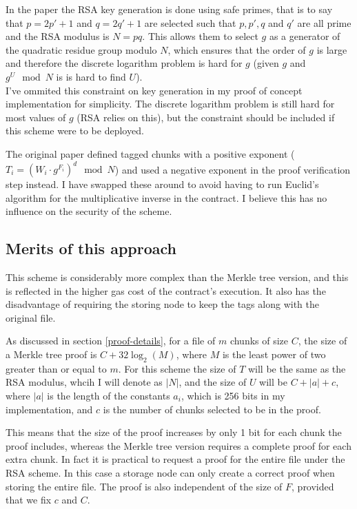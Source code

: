 \documentclass[12pt,a4paper,twoside,openright]{report}
\begin{document}
In the paper the RSA key generation is done using safe primes, that is to say that $p = 2p' + 1$ and $q = 2q' + 1$ are selected
such that $p, p', q$ and $q'$ are all prime and the RSA modulus is $N = pq$.
This allows them to select $g$ as a generator of the quadratic residue group modulo $N$, which ensures
that the order of $g$ is large and therefore the discrete logarithm problem is hard for $g$
(given $g$ and $g^U \mod N$ is is hard to find $U$).\\
I've ommited this constraint on key generation in my proof of concept implementation for simplicity.
The discrete logarithm problem is still hard for most values of $g$ (RSA relies on this), but
the constraint should be included if this scheme were to be deployed.

The original paper defined tagged chunks with a positive exponent ($T_i = \left(W_i \cdot g^{F_i}\right)^d \mod N$)
and used a negative exponent in the proof verification step instead.
I have swapped these around to avoid having to run Euclid's algorithm for the multiplicative inverse in the contract.
I believe this has no influence on the security of the scheme.


\subsection{Merits of this approach}

This scheme is considerably more complex than the Merkle tree version, and this is reflected in the higher gas cost of the contract's execution.
It also has the disadvantage of requiring the storing node to keep the tags along with the original file.

As discussed in section \ref{proof-details}, for a file of $m$ chunks of size $C$, the size of a Merkle tree proof is $C + 32 \log_2(M)$, where $M$ is the least power of two greater than or equal to $m$.
For this scheme the size of $T$ will be the same as the RSA modulus, whcih I will denote as $|N|$,
and the size of $U$ will be $C + |a| + c$, where $|a|$ is the length of the constants $a_i$, which is 256 bits in my implementation,
and $c$ is the number of chunks selected to be in the proof.

This means that the size of the proof increases by only 1 bit for each chunk the proof includes,
whereas the Merkle tree version requires a complete proof for each extra chunk.
In fact it is practical to request a proof for the entire file under the RSA scheme.
In this case a storage node can only create a correct proof when storing the entire file.
The proof is also independent of the size of $F$, provided that we fix $c$ and $C$.
\end{document}

